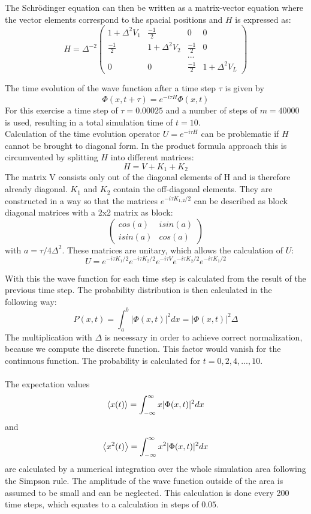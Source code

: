 \documentclass[12pt,a4paper]{article}
\begin{document}
The Schrödinger equation can then be written as a matrix-vector equation where the vector elements correspond to the spacial positions and $H$ is expressed as:
$$ H= \Delta^{-2} \left(\begin{matrix}1+\Delta^2V_1&\frac{-1}{2}&0&0\\\frac{-1}{2}&1+\Delta^2V_2&\frac{-1}{2}&0\\&&...&\\0&0&\frac{-1}{2}&1+\Delta^2V_L\end{matrix}\right) $$

The time evolution of the wave function after a time step $\tau$ is given by
\begin{equation}
\Phi(x,t+\tau) = e^{-i\tau H} \Phi(x,t)
\end{equation}
For this exercise a time step of $\tau = 0.00025$ and a number of steps of $m = 40000$ is used, resulting in a total simulation time of $t = 10$.\\
Calculation of the time evolution operator $U = e^{-i\tau H}$ can be problematic if $H$ cannot be brought to diagonal form. In the product formula approach this is circumvented by splitting $H$ into different matrices:
\begin{equation}
H = V + K_1 + K_2
\end{equation}
The matrix V consists only out of the diagonal elements of H and is therefore already diagonal. $K_1$ and $K_2$ contain the off-diagonal elements. They are constructed in a way so that the matrices $e^{-i\tau K_{1,2}/2}$ can be described as block diagonal matrices with a 2x2 matrix as block:
$$ \left(\begin{matrix}cos(a)&isin(a)\\isin(a)&cos(a)\end{matrix}\right) $$
with $a = \tau/4\Delta^2$. These matrices are unitary, which allows the calculation of $U$:
\begin{equation}
U = e^{-i\tau K_1/2} e^{-i\tau K_2/2} e^{-i\tau V} e^{-i\tau K_2/2} e^{-i\tau K_1/2} 
\end{equation}

With this the wave function for each time step is calculated from the result of the previous time step. The probability distribution is then calculated in the following way:
$$ P(x,t) = \int_{a}^{b} |\Phi(x,t)|^2 dx = |\Phi(x,t)|^2 \Delta$$
The multiplication with $\Delta$ is necessary in order to achieve correct normalization, because we compute the discrete function. This factor would vanish for the continuous function. The probability is calculated for $t = 0,2,4,...,10$.\\
\\
The expectation values
$$ \expval{x(t)} = \int_{-\infty}^{\infty} x|\Phi(x,t)|^2 dx$$
and
$$ \expval{x^2(t)} = \int_{-\infty}^{\infty} x^2|\Phi(x,t)|^2 dx$$
are calculated by a numerical integration over the whole simulation area following the Simpson rule. The amplitude of the wave function outside of the area is assumed to be small and can be neglected. This calculation is done every 200 time steps, which equates to a calculation in steps of $0.05$.
\end{document}
